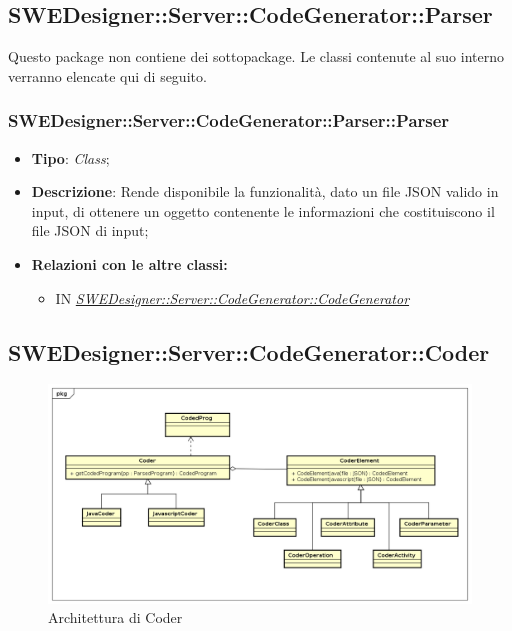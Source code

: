 \documentclass[../SpecificaTecnica.tex]{subfiles}
\begin{document}
			\subsection{SWEDesigner::Server::CodeGenerator::Parser}
			Questo package non contiene dei sottopackage.
			Le classi contenute al suo interno verranno elencate qui di seguito.
			
			\subsubsection{SWEDesigner::Server::CodeGenerator::Parser::Parser}
			\hypertarget{SWEDesigner::Server::CodeGenerator::Parser::Parser}{}
			\begin{itemize}
				\item \textbf{Tipo}: \emph{Class};
				\item \textbf{Descrizione}: Rende disponibile la funzionalità, dato un file JSON valido in input, di ottenere un oggetto contenente le informazioni che costituiscono il file JSON di input;
				\item \textbf{Relazioni con le altre classi:}
				\begin{itemize}
					\item IN \hyperlink{SWEDesigner::Server::CodeGenerator::CodeGenerator}{\emph{SWEDesigner::Server::CodeGenerator::CodeGenerator}}
				\end{itemize}	
			\end{itemize}
			
			
			
			\subsection{SWEDesigner::Server::CodeGenerator::Coder}
			\begin{figure}[H]\label{fig:Coder}
				\centering
				\includegraphics[scale=0.46]{Immagini/DiagrammaArchitettura/Coder.png}
				\caption{Architettura di Coder}
			\end{figure}
			
\end{document}
